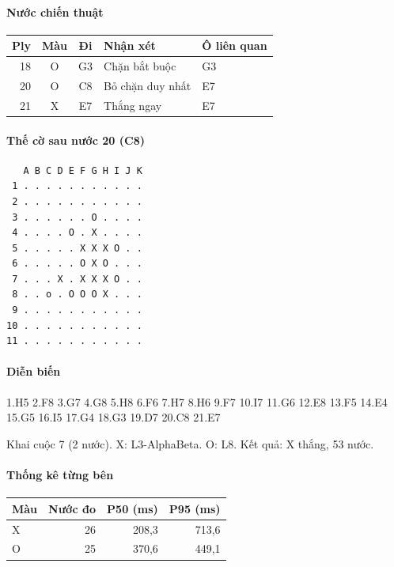 \paragraph{Nước chiến thuật}
\begin{center}\small
\begin{tabular}{@{}rccll@{}}
\toprule
Ply & Màu & Đi & Nhận xét & Ô liên quan \\
\midrule
18 & O & G3 & Chặn bắt buộc & G3 \\
20 & O & C8 & Bỏ chặn duy nhất & E7 \\
21 & X & E7 & Thắng ngay & E7 \\
\bottomrule
\end{tabular}
\end{center}
\paragraph{Thế cờ sau nước 20 (C8)}
\begin{verbatim}
   A B C D E F G H I J K
 1 . . . . . . . . . . .
 2 . . . . . . . . . . .
 3 . . . . . . O . . . .
 4 . . . . O . X . . . .
 5 . . . . . X X X O . .
 6 . . . . . O X O . . .
 7 . . . X . X X X O . .
 8 . . o . O O O X . . .
 9 . . . . . . . . . . .
10 . . . . . . . . . . .
11 . . . . . . . . . . .
\end{verbatim}
\paragraph{Diễn biến}
{\footnotesize 1.H5 2.F8 3.G7 4.G8 5.H8 6.F6 7.H7 8.H6 9.F7 10.I7 11.G6 12.E8 13.F5 14.E4 15.G5 16.I5 17.G4 18.G3 19.D7 20.C8 21.E7\par}
Khai cuộc 7 (2 nước). X: L3-AlphaBeta. O: L8. Kết quả: X thắng, 53 nước.
\paragraph{Thống kê từng bên}
\begin{center}\small
\begin{tabular}{@{}lrrr@{}}
\toprule
Màu & Nước đo & P50 (ms) & P95 (ms) \\
\midrule
X & 26 & 208,3 & 713,6 \\
O & 25 & 370,6 & 449,1 \\
\bottomrule
\end{tabular}
\end{center}
